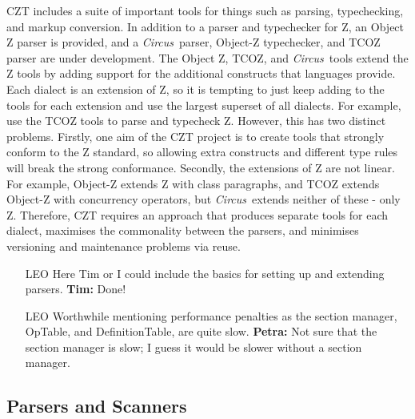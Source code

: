 \documentclass{llncs}
\newcommand{\Circus}{{\sf\slshape Circus}}
\begin{document}
  CZT includes a suite of important tools for things such as parsing,
  typechecking, and markup conversion. In addition to a parser and
  typechecker for Z, an Object Z parser is provided, and a \Circus\
  parser, Object-Z typechecker, and TCOZ parser are under development.
  The Object Z, TCOZ, and \Circus\ tools extend the Z tools by adding
  support for the additional constructs that languages provide.  Each
  dialect is an extension of Z, so it is tempting to just keep adding
  to the tools for each extension and use the largest superset of all
  dialects. For example, use the TCOZ tools to parse and typecheck
  Z. However, this has two distinct problems. Firstly, one aim of the
  CZT project is to create tools that strongly conform to the Z
  standard, so allowing extra constructs and different type rules will
  break the strong conformance. Secondly, the extensions of Z are not
  linear. For example, Object-Z extends Z with class paragraphs, and
  TCOZ extends Object-Z with concurrency operators, but \Circus\ extends
  neither of these - only Z. Therefore, CZT requires an approach that
  produces separate tools for each dialect, maximises the commonality
  between the parsers, and minimises versioning and maintenance
  problems via reuse.



  \begin{itemize}
    \item[LEO] Here Tim or I could include the basics for setting up
               and extending parsers. {\bf Tim:} Done!
    \item[LEO] Worthwhile mentioning performance penalties as the
               section manager, OpTable, and DefinitionTable, are
               quite slow. {\bf Petra:} Not sure that the section
               manager is slow; I guess it would be slower without a
               section manager.
  \end{itemize}


\subsection{Parsers and Scanners}
\end{document}
